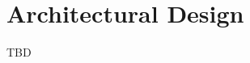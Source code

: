 \documentclass[main.tex]{subfiles}
\begin{document}
	\section{Architectural Design}
	
	TBD
	
	
\end{document}
